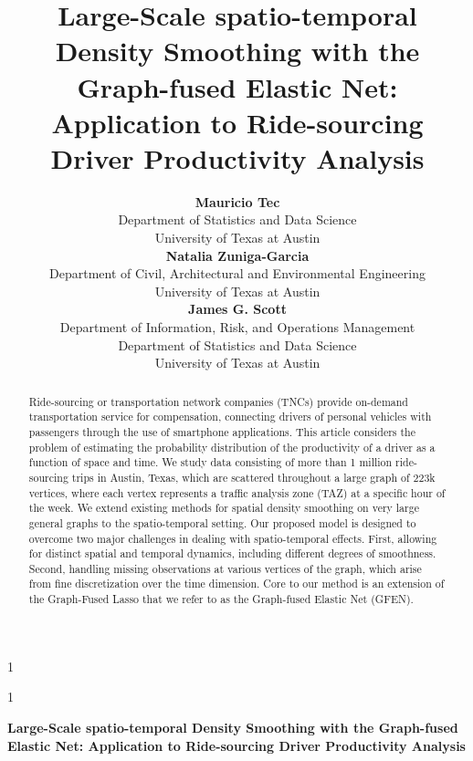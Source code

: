 \documentclass[a4paper, 11pt]{article}
\newcommand{\blind}{1}
\begin{document}

\blind %
{
  \title{\vspace{-2cm} \bf Large-Scale spatio-temporal Density Smoothing with the Graph-fused Elastic Net: Application to Ride-sourcing Driver Productivity Analysis}
  \author{\textbf{Mauricio Tec}\\
    Department of Statistics and Data Science\\ University of Texas at Austin \vspace{.1cm} \\ 
    \textbf{Natalia Zuniga-Garcia} \\
    Department of Civil, Architectural and Environmental Engineering \\
    University of Texas at Austin \\
    \textbf{James G. Scott}\\
    Department of Information, Risk, and Operations Management \\ Department of Statistics and Data Science\\ University of Texas at Austin \vspace{.1cm}}
  \maketitle
} \fi

\blind
{
  \bigskip
  \bigskip
  \bigskip
  \begin{center}
    {\LARGE\bf Large-Scale spatio-temporal Density Smoothing with the Graph-fused Elastic Net: Application to Ride-sourcing Driver Productivity Analysis}
\end{center}
  \medskip
} \fi

\vspace{-20px}
\begin{abstract}
Ride-sourcing or transportation network companies (TNCs) provide on-demand transportation service for compensation, connecting drivers of personal vehicles with passengers through the use of smartphone applications. This article considers the problem of estimating the probability distribution of the productivity of a driver as a function of space and time. We study data consisting of more than 1 million ride-sourcing trips in Austin, Texas, which are scattered throughout a large graph of 223k vertices, where each vertex represents a traffic analysis zone (TAZ) at a specific hour of the week. We extend existing methods for spatial density smoothing on very large general graphs to the spatio-temporal setting. Our proposed model is designed to overcome two major challenges in dealing with spatio-temporal effects. First, allowing for distinct spatial and temporal dynamics, including different degrees of smoothness. Second, handling missing observations at various vertices of the graph, which arise from fine discretization over the time dimension. Core to our method is an extension of the Graph-Fused Lasso that we refer to as the Graph-fused Elastic Net (GFEN).
\end{abstract}
\end{document}
